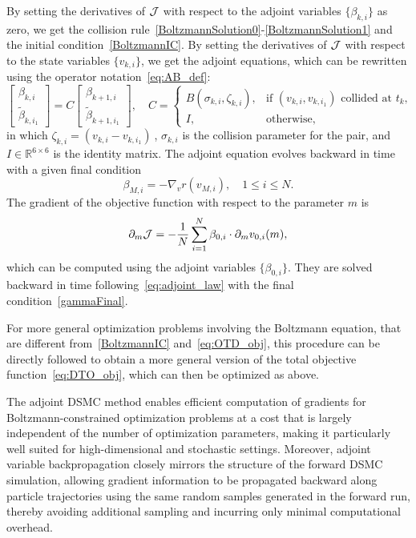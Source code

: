 \documentclass[12pt,nopreprintline]{elsarticle}
\newcommand{\bbR}{\mathbb R} \newcommand{\bbS}{\mathbb S}
\begin{document}
By setting the derivatives of $\mathcal J$ with respect to the adjoint variables $\{\beta_{k,i}\}$ as zero, we get the collision rule~\eqref{BoltzmannSolution0}-\eqref{BoltzmannSolution1} and the initial condition~\eqref{BoltzmannIC}. By setting the  derivatives of $\mathcal J$ with respect to the state variables $\{v_{k,i}\}$, we get the adjoint equations, which can be rewritten using the operator notation~\eqref{eq:AB_def}:
\begin{equation} \label{eq:adjoint_law}
   \begin{bmatrix}
    \beta_{k,i}\\
    \tilde \beta_{k,i_1}
    \end{bmatrix}     = C \begin{bmatrix}
    \beta_{k+1,i}\\
    \tilde \beta_{k+1,i_1}
    \end{bmatrix},\quad
C  = \begin{cases}
    B(\sigma_{k,i},\zeta_{k,i}) ,  & \text{if $(v_{k,i},v_{k,i_1})$ collided at $t_k$,}\\
    I , & \text{otherwise},
    \end{cases}
\end{equation}
in which $\zeta_{k,i}=(v_{k,i} - v_{k,i_1} ){\hat ~}$, $\sigma_{k,i}$ is the collision parameter for the pair, and $I\in\bbR^{6\times 6}$ is the identity matrix. The adjoint equation evolves backward in time with a given final condition
\begin{equation}\label{gammaFinal}
\beta_{M,i} = - \nabla_v r(v_{M,i}), \quad 1\leq i \leq N.
\end{equation}
The gradient of the objective function with respect to the parameter $m$ is
\begin{equation*}
    \partial_m \mathcal J =  - \frac{1}{N}\sum_{i=1}^N \beta_{0,i} \cdot  \partial_m v_{0,i}(m),
\end{equation*}
which can be computed using the adjoint variables $\{\beta_{0,i}\}$. They are solved backward in time following~\eqref{eq:adjoint_law} with the final condition~\eqref{gammaFinal}.

For more general optimization problems involving  the Boltzmann equation, that are different from~\eqref{BoltzmannIC} and~\eqref{eq:OTD_obj}, this procedure can be directly followed to obtain a more general version of the total objective function~\eqref{eq:DTO_obj}, which can then be optimized as above.

The adjoint DSMC method enables efficient computation of gradients for Boltzmann-constrained optimization problems at a cost that is largely independent of the number of optimization parameters, making it particularly well suited for high-dimensional and stochastic settings. Moreover, adjoint variable backpropagation closely mirrors the structure of the forward DSMC simulation, allowing gradient information to be propagated backward along particle trajectories using the same random samples generated in the forward run, thereby avoiding additional sampling and incurring only minimal computational overhead.
\end{document}
